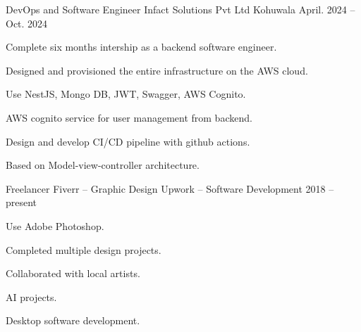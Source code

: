

\begin{cventries}

  \cventry
    {DevOps and Software Engineer} %
    {Infact Solutions Pvt Ltd} %
    {Kohuwala} %
    {April. 2024 -- Oct. 2024} %
    {
      \begin{cvitems} %
        \item {Complete six months intership as a backend software engineer.}
        \item {Designed and provisioned the entire infrastructure on the AWS cloud.}
        \item {Use NestJS, Mongo DB, JWT, Swagger, AWS Cognito.}
        \item {AWS cognito service for user management from backend.}
        \item {Design and develop CI/CD pipeline with github actions.}
        \item {Based on Model-view-controller architecture.}
      \end{cvitems}
    }

  \cventry
    {Freelancer} %
    {Fiverr -- Graphic Design} %
    {Upwork -- Software Development} %
    {2018 -- present} %
    {
      \begin{cvitems} %
        \item {Use Adobe Photoshop.}
        \item {Completed multiple design projects.}
        \item {Collaborated with local artists.}
        \item {AI projects.}
        \item {Desktop software development.}
      \end{cvitems}
    }


\end{cventries}
